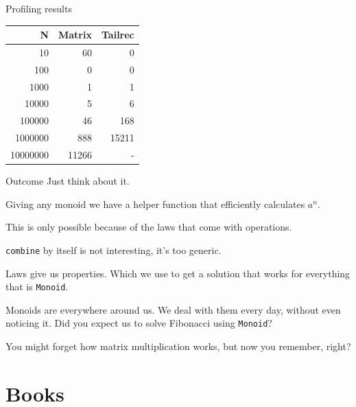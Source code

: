 \documentclass[presentation,aspectratio=169,smaller]{beamer}
\begin{document}
\begin{frame}[label={sec:org75bb547}]{Profiling results}
\begin{center}
\begin{tabular}{rrr}
N & Matrix & Tailrec\\
\hline
10 & 60 & 0\\
100 & 0 & 0\\
1000 & 1 & 1\\
10000 & 5 & 6\\
100000 & 46 & 168\\
1000000 & 888 & 15211\\
10000000 & 11266 & -\\
\end{tabular}
\end{center}
\end{frame}

\begin{frame}[label={sec:orgc073b77},fragile]{Outcome}
 Just think about it.

\pause
Giving any monoid we have a helper function that efficiently calculates \(a^n\).

\pause
This is only possible because of the \alert{laws} that come with operations.

\pause
\texttt{combine} by itself is not interesting, it's too generic.

\pause
Laws give us \alert{properties}. Which we use to get a solution that works for
everything that is \texttt{Monoid}.

\pause
Monoids are everywhere around us. We deal with them every day, without even
noticing it. Did you expect us to solve Fibonacci using \texttt{Monoid}?

\pause
You might forget how matrix multiplication works, but now you remember, right?
\end{frame}

\section*{Books}
\label{sec:org9552a30}
\end{document}
